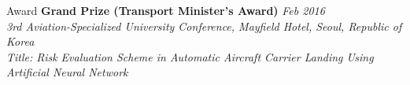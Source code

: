 \documentclass{resume}
\begin{document}
%
%
%
%
% 
%
%
%

%
%
%






%
%
%
%
%
%
\begin{rSection}{Award}
{\bf Grand Prize (Transport Minister's Award)} \hfill {\em Feb 2016} \\ 
\textit{3rd Aviation-Specialized University Conference, Mayfield Hotel, Seoul, Republic of Korea} \\
\textit{Title: Risk Evaluation Scheme in Automatic Aircraft Carrier Landing Using Artificial Neural Network}

\end{rSection}
\end{document}
